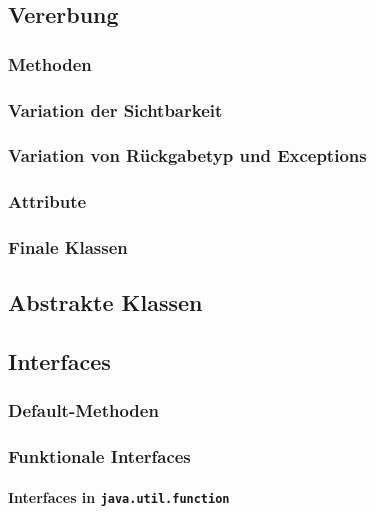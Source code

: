 \subsection{Vererbung}
	
	\subsubsection{Methoden}
	
	\subsubsection{Variation der Sichtbarkeit}
	
	\subsubsection{Variation von Rückgabetyp und Exceptions}
	
	\subsubsection{Attribute}
	
	\subsubsection{Finale Klassen}

\subsection{Abstrakte Klassen}

\subsection{Interfaces}
	
	\subsubsection{Default-Methoden}
	
	\subsubsection{Funktionale Interfaces}
		
		\paragraph{Interfaces in \texttt{java.util.function}}

